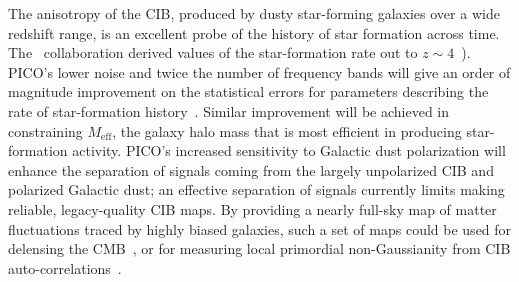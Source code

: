 \documentclass[PICOReport.tex]{subfiles}
\begin{document}
The anisotropy of the \ac{CIB}, produced by dusty star-forming galaxies over a wide redshift range, is an excellent probe of the history of star formation across time. The \planck\ collaboration derived values of the star-formation rate out to $z\sim4$~\cite{2014A&A...571A..30P,2014A&A...571A..18P,madau2014}). PICO's lower noise and twice the number of frequency bands will give an order of magnitude improvement on the statistical errors for parameters describing the rate of star-formation history~\cite{Wu:2016hej}. Similar improvement will be achieved in constraining $M_{\mathrm{eff}}$, the galaxy halo mass that is most efficient in producing star-formation activity. PICO's increased sensitivity to Galactic dust polarization will enhance the separation of signals coming from the largely unpolarized \ac{CIB} and polarized Galactic dust; an effective separation of signals currently limits making reliable, legacy-quality \ac{CIB} maps. By providing a nearly full-sky map of matter fluctuations traced by highly biased galaxies, such a set of maps could be used for delensing the CMB~\cite{Schmittfull/seljak}, or for measuring local primordial non-Gaussianity from \ac{CIB} auto-correlations~\cite{tucci}. 


\end{document}
